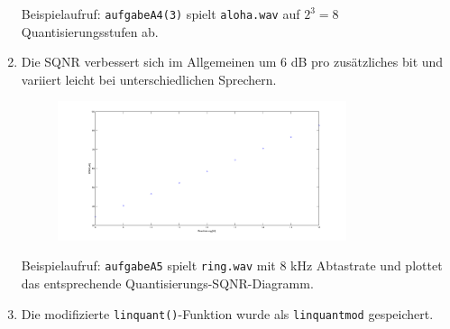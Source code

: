 \documentclass[a4paper,10pt]{scrartcl}
\begin{document}
\begin{enumerate}
Beispielaufruf: \texttt{aufgabeA4(3)} spielt \texttt{aloha.wav} auf \(2^3 = 8\) Quantisierungsstufen ab.
  \item Die SQNR verbessert sich im Allgemeinen um 6 dB pro zusätzliches bit und variiert leicht bei unterschiedlichen Sprechern. 
\begin{figure}[h]
 \centering
 \includegraphics[width=0.8\textwidth]{./Bilder/A/1_5.png}
\end{figure}

Beispielaufruf: \texttt{aufgabeA5} spielt \texttt{ring.wav} mit 8 kHz Abtastrate und plottet das entsprechende Quantisierungs-SQNR-Diagramm.
  \item Die modifizierte \texttt{linquant()}-Funktion wurde als \texttt{linquantmod} gespeichert.  
\end{enumerate}
\end{document}
